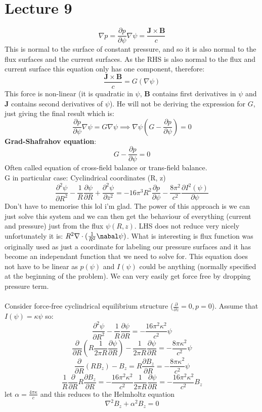 \documentclass{article}
\begin{document}
\section{Lecture 9}
$$
\nabla p = \frac{\partial p}{\partial \psi} \nabla \psi = \frac{\bm J \times \bm B}{c}
$$
This is normal to the surface of constant pressure, and so it is also normal to the flux surfaces and the current surfaces. As the RHS is also normal to the flux and current surface this equation only has one component, therefore:
$$
\frac{\bm J \times \bm B}{c} = G(\nabla \psi)
$$
This force is non-linear (it is quadratic in $\psi$, $\bm B$ contains first derivatives in $\psi$ and $\bm J$ contains second derivatives of $\psi$). He will not be deriving the expression for $G$, just giving the final result which is:
$$
\frac{\partial p}{\partial \psi} \nabla \psi = G \nabla \psi \implies \nabla \psi(G - \frac{\partial p}{\partial \psi}) = 0
$$
\textbf{Grad-Shafrahov equation}:
$$
G - \frac{\partial p}{\partial \psi} = 0
$$
Often called equation of cross-field balance or trans-field balance.\\
G in particular case: Cyclindrical coordinates (R, z)
$$
\frac{\partial^2 \psi}{\partial R^2} - \frac{1}{R} \frac{\partial \psi}{\partial R} + \frac{\partial ^2 \psi}{\partial z^2} = - 16\pi^3 R^2 \frac{\partial p}{\partial \psi} - \frac{8\pi^2}{c^2} \frac{\partial I^2(\psi)}{\partial \psi}
$$
Don't have to memorise this lol i'm glad. The power of this approach is we can just solve this system and we can then get the behaviour of everything (current and pressure) just from the flux $\psi(R,z)$. LHS does not reduce very nicely unfortunately it is: $R^2 \nabla \cdot( \frac{1}{R^2} \nabal \psi)$. What is interesting is flux function was originally used as just a coordinate for labeling our pressure surfaces and it has become an independant function that we need to solve for. This equation does not have to be linear as $p(\psi)$ and $I(\psi)$ could be anything (normally specified at the beginning of the problem). We can very easily get force free by dropping pressure term.\\\\
Consider force-free cyclindrical equilibrium structure ($\frac{\partial }{\partial z} = 0, p = 0$). Assume that $I(\psi) = \kappa \psi$ so:
$$
\frac{\partial^2 \psi}{\partial R^2} - \frac{1}{R} \frac{\partial \psi}{\partial R} = - \frac{16\pi^2\kappa^2}{c^2}\psi$$
$$
\frac{\partial}{\partial R}(R\frac{1}{2 \pi R} \frac{\partial \psi}{\partial R}) - \frac{1}{2\pi R} \frac{\partial \psi}{\partial R} = - \frac{8 \pi \kappa^2}{c^2} \psi
$$
$$
\frac{\partial}{\partial R}(RB_z) - B_z = R\frac{\partial B_z}{\partial R} = - \frac{8 \pi \kappa^2}{c^2} \psi
$$
$$
\frac{1}{R}\frac{\partial}{\partial R} R \frac{\partial B_z}{\partial R} =  - \frac{16 \pi^2 \kappa^2}{c^2} \frac{1}{2\pi R}\frac{\partial \psi}{\partial R} = - \frac{16 \pi^2 \kappa^2}{c^2} B_z
$$
let $\alpha = \frac{4\pi\kappa}{c}$ and this reduces to the Helmholtz equation
$$
\nabla^2 B_z + \alpha^2 B_z = 0
$$
\end{document}
